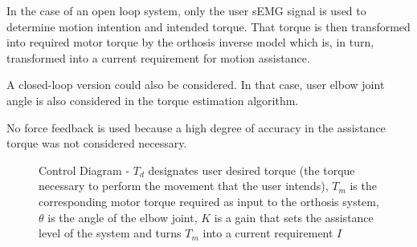 In the case of an open loop system, only the user sEMG signal is used to determine 
motion intention and intended torque. That torque is then transformed into required 
motor torque by the orthosis inverse model which is, in turn, transformed into a 
current requirement for motion assistance.  

A closed-loop version could also be considered. In that case, user elbow joint 
angle is also considered in the torque estimation algorithm.  

No force feedback is used because a high degree of accuracy in the assistance 
torque was not considered necessary.  

\begin{figure}[htbp]
    \centering
    \caption{
      Control Diagram - $T_d$ designates user desired torque (the torque 
      necessary to perform the movement that the user intends), $T_m$ is the 
      corresponding motor torque required as input to the orthosis system, $\theta$ 
      is the angle of the elbow joint, $K$ is a gain that sets the assistance level 
      of the system and turns $T_m$ into a current requirement $I$
    }
    \label{fig:control_diagram}
\end{figure}

